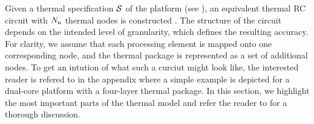 Given a thermal specification $\mathcal{S}$ of the platform (see ), an equivalent thermal RC circuit with $N_\text{n}$ thermal nodes is constructed \cite{kreith2000}. The structure of the circuit depends on the intended level of granularity, which defines the resulting accuracy. For clarity, we assume that each processing element is mapped onto one corresponding node, and the thermal package is represented as a set of additional nodes. To get an intution of what such a curciut might look like, the interested reader is refered to  in the appendix where a simple example is depicted for a dual-core platform with a four-layer thermal package. In this section, we highlight the most important parts of the thermal model and refer the reader to  for a thorough discussion.

